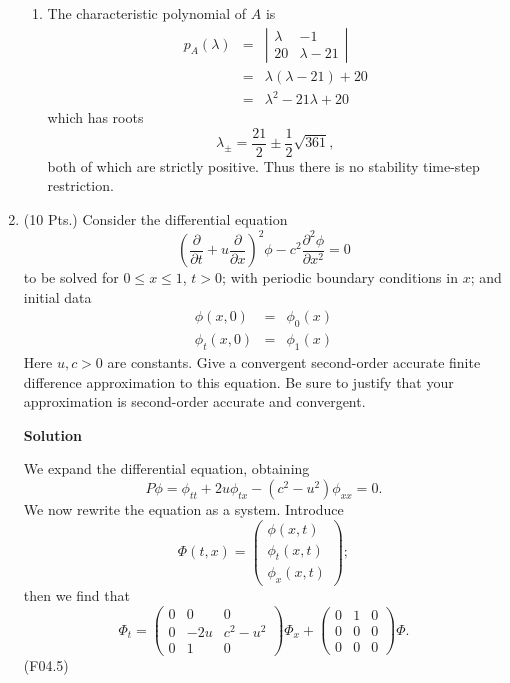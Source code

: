 \documentclass{article}
\begin{document}
\begin{enumerate}
\begin{enumerate}
\item The characteristic polynomial of \(A\) is
\begin{eqnarray*}
p_A(\lambda) & = & \left| \begin{array}{cc} \lambda & -1 \\ 20 & \lambda - 21 \end{array} \right| \\
             & = & \lambda (\lambda - 21) + 20 \\
             & = & \lambda^2 - 21 \lambda + 20
\end{eqnarray*}
which has roots
\[\lambda_{\pm} = \frac{21}{2} \pm \frac{1}{2} \sqrt{361},\]
both of which are strictly positive.  Thus there is no stability time-step restriction.

\end{enumerate}



\item (10 Pts.) Consider the differential equation
\[\left( \frac{\partial}{\partial t} + u \frac{\partial}{\partial x} \right)^2 \phi - c^2 \frac{\partial^2 \phi}{\partial x^2} = 0\]
to be solved for \(0 \leq x \leq 1\), \(t > 0\); with periodic boundary conditions in \(x\); and initial data
\begin{eqnarray*}
\phi(x,0) & = & \phi_0(x) \\
\phi_t(x,0) & = & \phi_1(x)
\end{eqnarray*}
Here \(u,c > 0\) are constants.  Give a convergent second-order accurate finite difference approximation to this equation.  Be sure to justify that your approximation is second-order accurate and convergent.

{\bf Solution}

We expand the differential equation, obtaining
\[P \phi = \phi_{tt} + 2u \phi_{tx} - (c^2 - u^2) \phi_{xx} = 0.\]
We now rewrite the equation as a system.  Introduce
\[\Phi(t,x) = \left( \begin{array}{c} \phi(x,t) \\ \phi_t(x,t) \\ \phi_x(x,t) \end{array} \right);\]
then we find that
\[\Phi_t = \left( \begin{array}{ccc} 0 & 0 & 0 \\ 0 & -2u & c^2 - u^2 \\ 0 & 1 & 0 \end{array} \right) \Phi_x
         + \left( \begin{array}{ccc} 0 & 1 & 0 \\ 0 & 0 & 0 \\ 0 & 0 & 0 \end{array} \right) \Phi.\]
(F04.5)




\end{enumerate}
\end{document}

